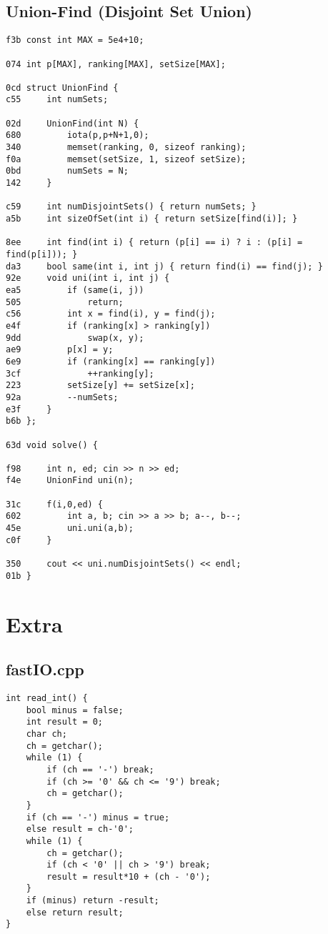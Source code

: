 \documentclass[11pt, a4paper, twoside]{article}
\begin{document}
\subsection{Union-Find (Disjoint Set Union)}
\begin{lstlisting}
f3b const int MAX = 5e4+10;

074 int p[MAX], ranking[MAX], setSize[MAX];

0cd struct UnionFind {
c55     int numSets;
    
02d     UnionFind(int N) {
680 		iota(p,p+N+1,0);
340 		memset(ranking, 0, sizeof ranking);
f0a 		memset(setSize, 1, sizeof setSize);
0bd         numSets = N;
142     }
    
c59     int numDisjointSets() { return numSets; }
a5b     int sizeOfSet(int i) { return setSize[find(i)]; }
    
8ee     int find(int i) { return (p[i] == i) ? i : (p[i] = find(p[i])); }
da3     bool same(int i, int j) { return find(i) == find(j); }
92e     void uni(int i, int j) {
ea5         if (same(i, j))
505             return;
c56         int x = find(i), y = find(j);
e4f         if (ranking[x] > ranking[y])
9dd             swap(x, y);
ae9         p[x] = y;
6e9         if (ranking[x] == ranking[y])
3cf             ++ranking[y];
223         setSize[y] += setSize[x];
92a         --numSets;
e3f     }
b6b };

63d void solve() {
    
f98 	int n, ed; cin >> n >> ed;
f4e 	UnionFind uni(n);
    
31c 	f(i,0,ed) {
602 		int a, b; cin >> a >> b; a--, b--;
45e 		uni.uni(a,b);
c0f 	}
    
350 	cout << uni.numDisjointSets() << endl;
01b }
\end{lstlisting}

\pagebreak


%
%

\section{Extra}

\subsection{fastIO.cpp}
\begin{lstlisting}
int read_int() {
    bool minus = false;
    int result = 0;
    char ch;
    ch = getchar();
    while (1) {
        if (ch == '-') break;
        if (ch >= '0' && ch <= '9') break;
        ch = getchar();
    }
    if (ch == '-') minus = true;
    else result = ch-'0';
    while (1) {
        ch = getchar();
        if (ch < '0' || ch > '9') break;
        result = result*10 + (ch - '0');
    }
    if (minus) return -result;
    else return result;
}
\end{lstlisting}
\end{document}
